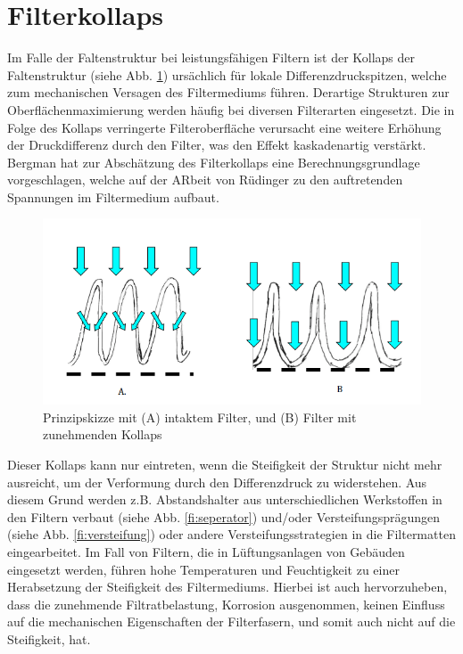 \section{Filterkollaps}
    Im Falle der Faltenstruktur bei leistungsfähigen Filtern ist der Kollaps der Faltenstruktur (siehe Abb. \ref{fi:kollaps}) ursächlich für lokale Differenzdruckspitzen, welche zum mechanischen Versagen des Filtermediums führen. Derartige Strukturen zur Oberflächenmaximierung werden häufig bei diversen Filterarten eingesetzt. Die in Folge des Kollaps verringerte Filteroberfläche verursacht eine weitere Erhöhung der Druckdifferenz durch den Filter, was den Effekt kaskadenartig verstärkt.\cite{hepa} Bergman \cite{hepa} hat zur Abschätzung des Filterkollaps eine Berechnungsgrundlage vorgeschlagen, welche auf der ARbeit von Rüdinger zu den auftretenden Spannungen im Filtermedium \cite{rudinger} aufbaut.
    \begin{figure}[H]
        \begin{center}
            \includegraphics[width=\linewidth]{images/kollaps.png}
            \caption[Filterkollaps]{Prinzipskizze mit (A) intaktem Filter, und (B) Filter mit zunehmenden Kollaps \cite{hepa}}
            \label{fi:kollaps}
        \end{center}
    \end{figure}
    Dieser Kollaps kann nur eintreten, wenn die Steifigkeit der Struktur nicht mehr ausreicht, um der Verformung durch den Differenzdruck zu widerstehen. Aus diesem Grund werden z.B. Abstandshalter aus unterschiedlichen Werkstoffen in den Filtern verbaut (siehe Abb. \ref{fi:seperator}) und/oder Versteifungsprägungen (siehe Abb. \ref{fi:versteifung}) oder andere Versteifungsstrategien in die Filtermatten eingearbeitet.
    Im Fall von Filtern, die in Lüftungsanlagen von Gebäuden eingesetzt werden, führen hohe Temperaturen und Feuchtigkeit zu einer Herabsetzung der Steifigkeit des Filtermediums.\cite{hepa} Hierbei ist auch hervorzuheben, dass die zunehmende Filtratbelastung, Korrosion ausgenommen, keinen Einfluss auf die mechanischen Eigenschaften der Filterfasern, und somit auch nicht auf die Steifigkeit, hat. 

